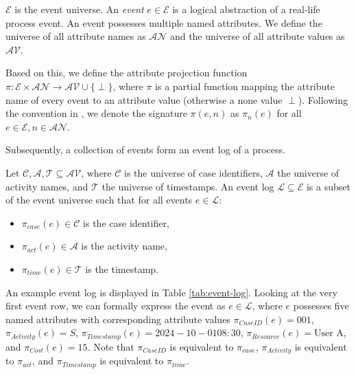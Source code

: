\begin{definition}[Event]
    $\mathcal{E}$ is the event universe. An \emph{event} $e \in \mathcal{E}$ is a logical abstraction of a real-life process event. An event possesses multiple named attributes. We define the universe of all attribute names as $\mathcal{AN}$ and the universe of all attribute values as $\mathcal{AV}$.  
\end{definition}

Based on this, we define the attribute projection function $\pi \colon \mathcal{E} \times \mathcal{AN} \rightarrow \mathcal{AV} \cup \{ \perp \}$, where $\pi$ is a partial function mapping the attribute name of every event to an attribute value (otherwise a none value $\perp$). Following the convention in \cite{bible}, we denote the signature $\pi(e, n)$ as $\pi_n(e)$ for all $e \in \mathcal{E}, n \in \mathcal{AN}$.

Subsequently, a collection of events form an event log of a process.

\begin{definition}
    Let $\mathcal{C, A, T} \subseteq \mathcal{AV}$, where $\mathcal{C}$ is the universe of case identifiers, $\mathcal{A}$ the universe of activity names, and $\mathcal{T}$ the universe of timestamps.  An event log $\mathcal{L} \subseteq \mathcal{E}$ is a subset of the event universe such that for all events $e \in \mathcal{L}$:
    
    \begin{itemize}
        \item $\pi_{case}(e) \in \mathcal{C}$ is the case identifier,
        \item $\pi_{act}(e) \in \mathcal{A}$ is the activity name,
        \item $\pi_{time}(e) \in \mathcal{T}$ is the timestamp.
    \end{itemize}
\end{definition}

An example event log is displayed in Table \ref{tab:event-log}. Looking at the very first event row, we can formally express the event as $e \in \mathcal{L}$,  where $e$ possesses five named attributes with corresponding attribute values $\pi_{Case ID}(e) = 001$, $\pi_{Activity}(e) = S$, $\pi_{Timestamp}(e) = 2024-10-01 08:30$, $\pi_{Resource}(e) = \text{User A}$, and $\pi_{Cost}(e) = 15$. Note that $\pi_{Case ID}$ is equivalent to $\pi_{case}$, $\pi_{Activity}$ is equivalent to $\pi_{act}$, and $\pi_{Timestamp}$ is equivalent to $\pi_{time}$.

